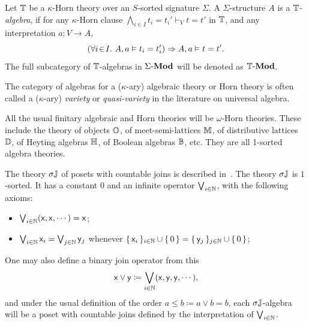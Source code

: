\begin{definition}
  Let $\mathbb{T}$ be a $\kappa$-Horn theory over an $S$-sorted signature $\Sigma$. A $\Sigma$-structure $A$ is a \emph{$\mathbb{T}$-algebra}, if for any $\kappa$-Horn clause $\bigwedge_{i\in I}t_i = t_i' \vdash_{V} t = t'$ in $\mathbb{T}$, and any interpretation $a\colon V \to A$, 
  \[ \left(\forall i\!\in\!I.\  A,a \vDash t_i = t_i'\right) \Rightarrow A,a \vDash t = t'. \]
  The full subcategory of $\mathbb{T}$-algebras in $\Sigma\text{-}\mathbf{Mod}$ will be denoted as $\mathbb{T}\text{-}\mathbf{Mod}$.
\end{definition}

\begin{remark}
  The category of algebras for a ($\kappa$-ary) algebraic theory or Horn theory is often called a ($\kappa$-ary) \emph{variety} or \emph{quasi-variety} in the literature on universal algebra.
\end{remark}

\begin{example}\label{exa:finitealgebratheories}
  All the usual finitary algebraic and Horn theories will be $\omega$-Horn theories. These include the theory of objects $\mathbb{O}$, of meet-semi-lattices $\mathbb{M}$, of distributive lattices $\mathbb{D}$, of Heyting algebras $\mathbb{H}$, of Boolean algebras $\mathbb{B}$, etc. They are all 1-sorted algebra theories.
\end{example}

\begin{example}\label{exa:theoryofcountablejoins}
  The theory $\sigma\mathbb{J}$ of posets with countable joins is described in~\citet[Exm. 3.26]{adamek1994locally}. The theory $\sigma\mathbb{J}$ is $1$-sorted. It has a constant 0 and an infinite operator $\bigvee_{i\in\mathbb{N}}$, with the following axioms:
  \begin{itemize}
    \item $\bigvee_{i\in\mathbb{N}}(\mathsf{x},\mathsf{x},\cdots) = \mathsf{x}$;
    \item $\bigvee_{i\in\mathbb{N}}\mathsf{x}_i = \bigvee_{j\in\mathbb{N}}\mathsf{y}_j$ whenever $\{\,\mathsf{x}_i\,\}_{i\in\mathbb{N}}\cup\{\,0\,\} = \{\,\mathsf{y}_j\,\}_{j\in\mathbb{N}}\cup\{\,0\,\}$;
  \end{itemize}
  One may also define a binary join operator from this
  \[ \mathsf{x} \vee \mathsf{y} \coloneq \bigvee_{i\in\mathbb{N}}(\mathsf{x},\mathsf{y},\mathsf{y},\cdots), \]
  and under the usual definition of the order $a \le b \coloneq a \vee b = b$, each $\sigma\mathbb{J}$-algebra will be a poset with countable joins defined by the interpretation of $\bigvee_{i\in\mathbb{N}}$.
\end{example}

